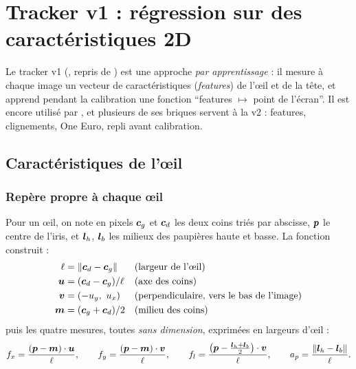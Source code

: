 \chapter{Tracker v1 : régression sur des caractéristiques 2D}
\label{chap:v1}

Le tracker v1 (, repris de ) est une approche \emph{par apprentissage} : il mesure à chaque image un vecteur de caractéristiques (\emph{features}) de l'œil et de la tête, et apprend pendant la calibration une fonction \enquote{features $\mapsto$ point de l'écran}. Il est encore utilisé par , et plusieurs de ses briques servent à la v2 : features, clignements, One Euro, repli avant calibration.

\section{Caractéristiques de l'œil}
\label{sec:features}

\subsection{Repère propre à chaque œil}

Pour un œil, on note en pixels $\bm{c}_g$ et $\bm{c}_d$ les deux coins triés par abscisse, $\bm{p}$ le centre de l'iris, et $\bm{l}_h$, $\bm{l}_b$ les milieux des paupières haute et basse. La fonction  construit :
\begin{align}
  \ell &= \|\bm{c}_d - \bm{c}_g\| && \text{(largeur de l'œil)}\\
  \bm{u} &= (\bm{c}_d - \bm{c}_g)/\ell && \text{(axe des coins)}\\
  \bm{v} &= (-u_y,\ u_x) && \text{(perpendiculaire, vers le bas de l'image)}\\
  \bm{m} &= (\bm{c}_g + \bm{c}_d)/2 && \text{(milieu des coins)}
\end{align}
puis les quatre mesures, toutes \emph{sans dimension}, exprimées en largeurs d'œil :
\begin{equation}
  f_x = \frac{(\bm{p} - \bm{m})\cdot\bm{u}}{\ell}, \qquad
  f_y = \frac{(\bm{p} - \bm{m})\cdot\bm{v}}{\ell}, \qquad
  f_l = \frac{\big(\bm{p} - \tfrac{\bm{l}_h + \bm{l}_b}{2}\big)\cdot\bm{v}}{\ell}, \qquad
  a_p = \frac{\|\bm{l}_h - \bm{l}_b\|}{\ell}.
\end{equation}

